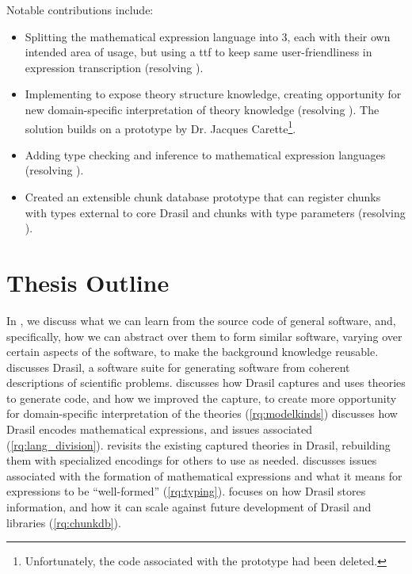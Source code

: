 Notable contributions include:

\begin{itemize}

      \item Splitting the mathematical expression language into 3, each with
            their own intended area of usage, but using a \acs{ttf}
            \cite{Carette2009} to keep same user-friendliness in expression
            transcription (resolving ).

      \item Implementing \ModelKinds{} to expose theory structure knowledge,
            creating opportunity for new domain-specific interpretation of
            theory knowledge (resolving ). The solution
            builds on a prototype by Dr. Jacques Carette\footnote{Unfortunately,
                  the code associated with the prototype had been deleted.}.

      \item Adding type checking and inference to mathematical expression
            languages (resolving ).

      \item Created an extensible chunk database prototype that can register
            chunks with types external to core Drasil and chunks with type
            parameters (resolving ).

\end{itemize}

\section{Thesis Outline}
\label{sec:intro:outline}

In , we discuss what we can learn from the source code of
general software, and, specifically, how we can abstract over them to form
similar software, varying over certain aspects of the software, to make the
background knowledge reusable.  discusses Drasil, a software
suite for generating software from coherent descriptions of scientific problems.
 discusses how Drasil captures and uses theories to
generate code, and how we improved the capture, to create more opportunity for
domain-specific interpretation of the theories (\ref{rq:modelkinds})
 discusses how Drasil encodes mathematical expressions,
and issues associated (\ref{rq:lang_division}). 
revisits the existing captured theories in Drasil, rebuilding them with
specialized encodings for others to use as needed. 
discusses issues associated with the formation of mathematical expressions and
what it means for expressions to be ``well-formed'' (\ref{rq:typing}).
 focuses on how Drasil stores information, and how it
can scale against future development of Drasil and libraries (\ref{rq:chunkdb}).
